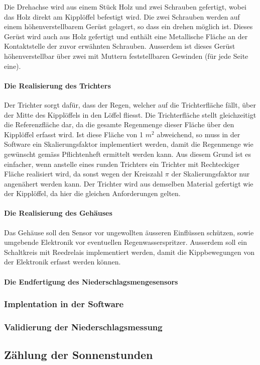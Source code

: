 Die Drehachse wird aus einem Stück Holz und zwei Schrauben gefertigt, wobei das Holz direkt am Kipplöffel befestigt wird. Die zwei Schrauben werden auf einem höhenverstellbarem Gerüst gelagert, so dass ein drehen möglich ist. Dieses Gerüst wird auch aus Holz gefertigt und enthält eine Metallische Fläche an der Kontaktstelle der zuvor erwähnten Schrauben. Ausserdem ist dieses Gerüst höhenverstellbar über zwei mit Muttern feststellbaren Gewinden (für jede Seite eine). 

\paragraph{Die Realisierung des Trichters}
Der Trichter sorgt dafür, dass der Regen, welcher auf die Trichterfläche fällt, über der Mitte des Kipplöffels in den Löffel fliesst. Die Trichterfläche stellt gleichzeitigt die Referenzfläche dar, da die gesamte Regenmenge dieser Fläche über den Kipplöffel erfasst wird. Ist diese Fläche von 1 $m^2$ abweichend, so muss in der Software ein Skalierungsfaktor implementiert werden, damit die Regenmenge wie gewünscht gemäss Pflichtenheft ermittelt werden kann. Aus diesem Grund ist es einfacher, wenn anstelle eines runden Trichters ein Trichter mit Rechteckiger Fläche realisiert wird, da sonst wegen der Kreiszahl $\pi$ der Skalierungsfaktor nur angenähert werden kann. Der Trichter wird aus demselben Material gefertigt wie der Kipplöffel, da hier die gleichen Anforderungen gelten.

\paragraph{Die Realisierung des Gehäuses}
Das Gehäuse soll den Sensor vor ungewollten äusseren Einflüssen schützen, sowie umgebende Elektronik vor eventuellen Regenwasserspritzer. Ausserdem soll ein Schaltkreis mit Reedrelais implementiert werden, damit die Kippbewegungen von der Elektronik erfasst werden können.

\paragraph{Die Endfertigung des Niederschlagsmengesensors}

\subsubsection*{Implentation in der Software}
\subsubsection*{Validierung der Niederschlagsmessung}
 

\subsection{Zählung der Sonnenstunden}
